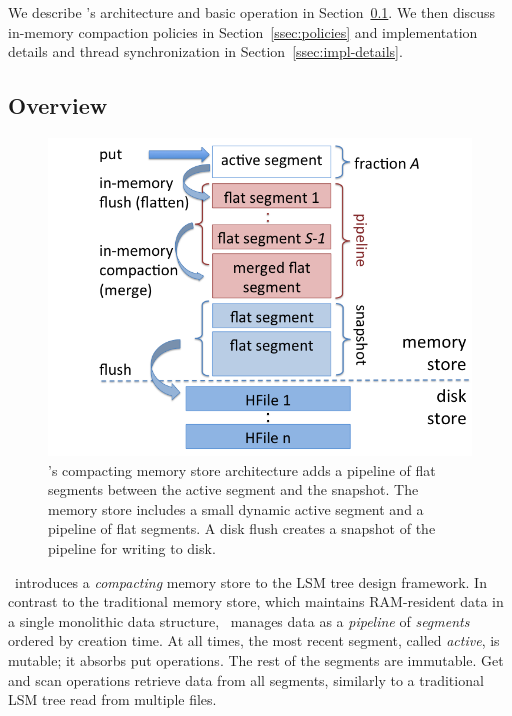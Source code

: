 
We describe  \sys's architecture and basic operation in Section~\ref{ssec:overview}.
We then discuss in-memory compaction policies  in  Section~\ref{ssec:policies}
and implementation details and thread synchronization in Section~\ref{ssec:impl-details}.

\subsection{Overview} \label{ssec:overview}

\begin{figure}[tbh]
\center
\includegraphics[width=\columnwidth]{accordion-arch} 
\caption{\sys's compacting memory store architecture adds a pipeline of flat segments between the active segment and the snapshot. 
The memory store includes a small dynamic active segment 
and a pipeline of flat segments. A disk flush creates a snapshot of the pipeline for writing to disk.}
\label{fig:accordion}
\end{figure}

\sys\ introduces a \emph{compacting} memory store to the LSM tree design framework. In contrast to the traditional memory store, 
which maintains RAM-resident data in a single monolithic data structure, \sys\ manages data as a \emph{pipeline} of 
\emph{segments} ordered by creation time. 
At all times, the most recent segment, called \emph{active}, is mutable;
it absorbs put operations. The rest of the segments are immutable.  
%
Get and scan operations retrieve data from all  segments,  similarly to a traditional LSM tree read from multiple files. 
  
